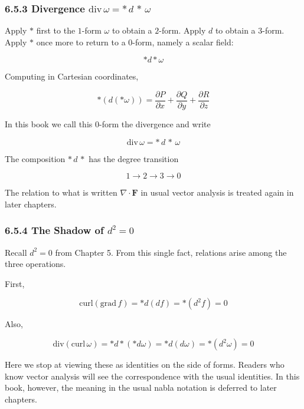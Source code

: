 \documentclass[a4paper,12pt,openany]{book}
\begin{document}
\hypertarget{divergence-mathrmdivomega-astdastomega}{%
\subsubsection{\texorpdfstring{6.5.3 Divergence
\(\mathrm{div}\,\omega = \ast\,d\,\ast\,\omega\)}{6.5.3 Divergence \textbackslash mathrm\{div\}\textbackslash,\textbackslash omega = \textbackslash ast\textbackslash,d\textbackslash,\textbackslash ast\textbackslash,\textbackslash omega}}\label{divergence-mathrmdivomega-astdastomega}}

Apply \(\ast\) first to the \(1\)-form \(\omega\) to obtain a
\(2\)-form. Apply \(d\) to obtain a \(3\)-form. Apply \(\ast\) once more
to return to a \(0\)-form, namely a scalar field:

\[
\ast d\ast\omega
\]

Computing in Cartesian coordinates,

\[\ast(d(\ast\omega)) = \frac{\partial P}{\partial x} + \frac{\partial Q}{\partial y} + \frac{\partial R}{\partial z}\]

In this book we call this \(0\)-form the divergence and write

\[\mathrm{div}\,\omega = \ast\,d\,\ast\,\omega\]

The composition \(\ast\,d\,\ast\) has the degree transition

\[
1 \to 2 \to 3 \to 0
\]

The relation to what is written \(\nabla\cdot\mathbf F\) in usual vector
analysis is treated again in later chapters.

\hypertarget{the-shadow-of-d2-0}{%
\subsubsection{\texorpdfstring{6.5.4 The Shadow of
\(d^2 = 0\)}{6.5.4 The Shadow of d\^{}2 = 0}}\label{the-shadow-of-d2-0}}

Recall \(d^2 = 0\) from Chapter 5. From this single fact, relations
arise among the three operations.

First,

\[
\mathrm{curl}(\mathrm{grad}\,f)
=
\ast d(df)
=
\ast(d^2 f)
=
0
\]

Also,

\[
\mathrm{div}(\mathrm{curl}\,\omega)
=
\ast d\ast(\ast d\omega)
=
\ast d(d\omega)
=
\ast(d^2\omega)
=
0
\]

Here we stop at viewing these as identities on the side of forms.
Readers who know vector analysis will see the correspondence with the
usual identities. In this book, however, the meaning in the usual nabla
notation is deferred to later chapters.
\end{document}
